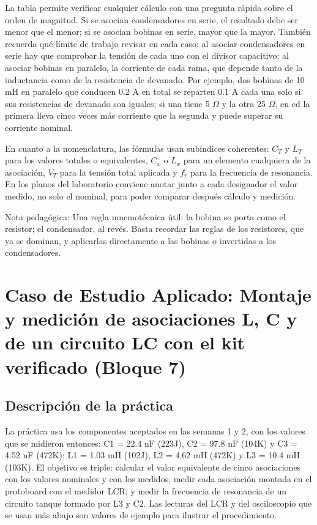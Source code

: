 \documentclass[11pt,letterpaper]{article}
\begin{document}
La tabla permite verificar cualquier cálculo con una pregunta rápida sobre el orden de magnitud. Si se asocian condensadores en serie, el resultado debe ser menor que el menor; si se asocian bobinas en serie, mayor que la mayor. También recuerda qué límite de trabajo revisar en cada caso: al asociar condensadores en serie hay que comprobar la tensión de cada uno con el divisor capacitivo; al asociar bobinas en paralelo, la corriente de cada rama, que depende tanto de la inductancia como de la resistencia de devanado. Por ejemplo, dos bobinas de 10 mH en paralelo que conducen 0.2 A en total se reparten 0.1 A cada una solo si sus resistencias de devanado son iguales; si una tiene 5 \ensuremath{\Omega} y la otra 25 \ensuremath{\Omega}, en cd la primera lleva cinco veces más corriente que la segunda y puede superar su corriente nominal.

En cuanto a la nomenclatura, las fórmulas usan subíndices coherentes: $C_T$ y $L_T$ para los valores totales o equivalentes, $C_x$ o $L_x$ para un elemento cualquiera de la asociación, $V_T$ para la tensión total aplicada y $f_r$ para la frecuencia de resonancia. En los planos del laboratorio conviene anotar junto a cada designador el valor medido, no solo el nominal, para poder comparar después cálculo y medición.

\begin{nota}{Nota pedagógica:}
Una regla mnemotécnica útil: \guillemotleft{}la bobina se porta como el resistor; el condensador, al revés\guillemotright{}. Basta recordar las reglas de los resistores, que ya se dominan, y aplicarlas directamente a las bobinas o invertidas a los condensadores.
\end{nota}

\section{Caso de Estudio Aplicado: Montaje y medición de asociaciones L, C y de un circuito LC con el kit verificado (Bloque 7)}

\subsection{Descripción de la práctica}

La práctica usa los componentes aceptados en las semanas 1 y 2, con los valores que se midieron entonces: C1 = 22.4 nF (223J), C2 = 97.8 nF (104K) y C3 = 4.52 nF (472K); L1 = 1.03 mH (102J), L2 = 4.62 mH (472K) y L3 = 10.4 mH (103K). El objetivo es triple: calcular el valor equivalente de cinco asociaciones con los valores nominales y con los medidos, medir cada asociación montada en el protoboard con el medidor LCR, y medir la frecuencia de resonancia de un circuito tanque formado por L3 y C2. Las lecturas del LCR y del osciloscopio que se usan más abajo son valores de ejemplo para ilustrar el procedimiento.
\end{document}
